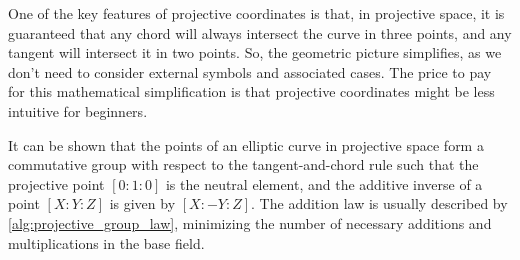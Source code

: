 One of the key features of projective coordinates is that, in projective space, it is guaranteed that any chord will always intersect the curve in three points, and any tangent will intersect it in two points. So, the geometric picture simplifies, as we don't need to consider external symbols and associated cases. The price to pay for this mathematical simplification is that projective coordinates might be less intuitive for beginners.

It can be shown that the points of an elliptic curve in projective space form a commutative group with respect to the tangent-and-chord rule such that the projective point $[0:1:0]$ is the neutral element, and the additive inverse of a point $[X:Y:Z]$ is given by $[X:-Y:Z]$. The addition law is usually described by  \algname{} \ref{alg:projective_group_law}, minimizing the number of necessary additions and multiplications in the base field. %

